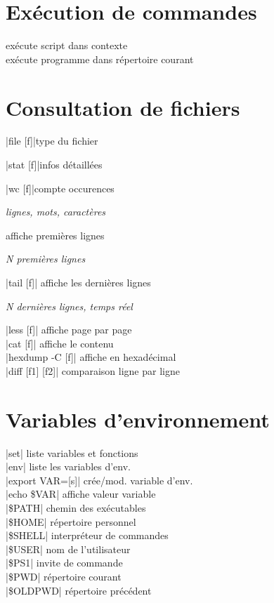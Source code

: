 \documentclass[9pt]{extarticle}
\newcommand{\lstcode}[1]{\inlinecode{\detokenize{#1}}}
\newenvironment{cmdblock}{%
  \par\setlength{\parindent}{0pt}\setlength{\parskip}{0pt}%
}{\par}
\newlength{\cmdoptindent}
\newcommand{\cmdopt}[1]{%
  \hspace*{\cmdoptindent}%
  \begin{minipage}[t]{\dimexpr\linewidth-\cmdoptindent\relax}
    \RaggedRight \itshape #1%
  \end{minipage}\par
}
\begin{document}
\begin{multicols}{4}
\section*{Exécution de commandes}
 \quad exécute script dans contexte \\
 exécute programme dans répertoire courant \\

\section*{Consultation de fichiers}

\begin{cmdblock}
\code|file [f]|\quad type du fichier\par
\code|stat [f]|\quad infos détaillées\par
\code|wc [f]|\quad compte occurences\par
\cmdopt{\lstcode{-l} lignes, \lstcode{-w} mots, \lstcode{-c} caractères}
\quad affiche premières lignes\par
\cmdopt{\lstcode{-n N} N premières lignes}
\code|tail [f]| \quad affiche les dernières lignes \\
\cmdopt{\lstcode{-n N} N dernières lignes,
        \lstcode{-f} temps réel}
\code|less [f]| \quad affiche page par page \\
\code|cat [f]| \quad affiche le contenu \\
\code|hexdump -C [f]| \quad affiche en hexadécimal \\
\code|diff [f1] [f2]| \quad comparaison ligne par ligne \\
\end{cmdblock}

\section*{Variables d'environnement}
\begin{cmdblock}
\code|set| \quad liste variables et fonctions \\
\code|env| \quad liste les variables d'env. \\
\code|export VAR=[s]| \quad crée/mod. variable d'env. \\
\code|echo \$VAR| \quad affiche valeur variable \\
\code|\$PATH| \quad chemin des exécutables \\
\code|\$HOME| \quad répertoire personnel \\
\code|\$SHELL| \quad interpréteur de commandes \\
\code|\$USER| \quad nom de l'utilisateur \\
\code|\$PS1| \quad invite de commande \\
\code|\$PWD| \quad répertoire courant \\
\code|\$OLDPWD| \quad répertoire précédent \\
\end{cmdblock}


\end{multicols}
\end{document}

